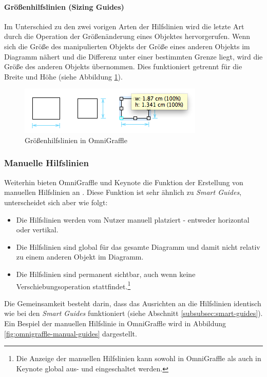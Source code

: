 \paragraph{Größenhilfslinien (Sizing Guides)}

Im Unterschied zu den zwei vorigen Arten der Hilfslinien wird die letzte Art durch die Operation der Größenänderung eines Objektes hervorgerufen. Wenn sich die Größe des manipulierten Objekts der Größe eines anderen Objekts im Diagramm nähert und die Differenz unter einer bestimmten Grenze liegt, wird die Größe des anderen Objekts übernommen. Dies funktioniert getrennt für die Breite und Höhe (siehe Abbildung \ref{fig:omnigraffle-sizing-guides}).

\begin{figure}[hbt]
    \centering
    \includegraphics{resources/omnigraffle-sizing-guides.png}
    \caption{Größenhilfslinien in OmniGraffle}
    \label{fig:omnigraffle-sizing-guides}
\end{figure}

\subsubsection{Manuelle Hilfslinien}

Weiterhin bieten OmniGraffle und Keynote die Funktion der Erstellung von manuellen Hilfslinien an \cite{08OmniGraffle, 11Keynote}. Diese Funktion ist sehr ähnlich zu \textit{Smart Guides}, unterscheidet sich aber wie folgt:

\begin{itemize}
    \item Die Hilfslinien werden vom Nutzer manuell platziert - entweder horizontal oder vertikal.
    \item Die Hilfslinien sind global für das gesamte Diagramm und damit nicht relativ zu einem anderen Objekt im Diagramm.
    \item Die Hilfslinien sind permanent sichtbar, auch wenn keine Verschiebungsoperation stattfindet.\footnote{Die Anzeige der manuellen Hilfslinien kann sowohl in OmniGraffle als auch in Keynote global aus- und eingeschaltet werden.}
\end{itemize}

Die Gemeinsamkeit besteht darin, dass das Ausrichten an die Hilfslinien identisch wie bei den \textit{Smart Guides} funktioniert (siehe Abschnitt \ref{subsubsec:smart-guides}). Ein Bespiel der manuellen Hilfslinie in OmniGraffle wird in Abbildung \ref{fig:omnigraffle-manual-guides} dargestellt.

